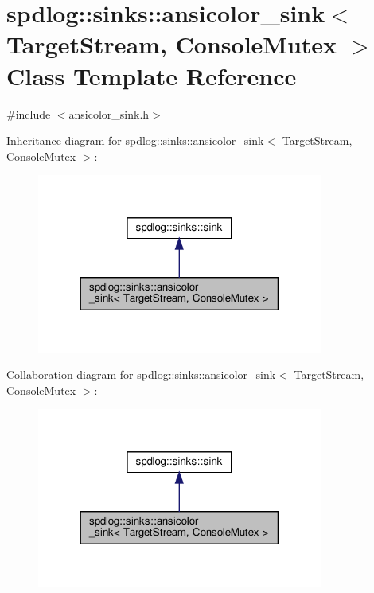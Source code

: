 \hypertarget{classspdlog_1_1sinks_1_1ansicolor__sink}{}\section{spdlog\+:\+:sinks\+:\+:ansicolor\+\_\+sink$<$ Target\+Stream, Console\+Mutex $>$ Class Template Reference}
\label{classspdlog_1_1sinks_1_1ansicolor__sink}


{\ttfamily \#include $<$ansicolor\+\_\+sink.\+h$>$}



Inheritance diagram for spdlog\+:\+:sinks\+:\+:ansicolor\+\_\+sink$<$ Target\+Stream, Console\+Mutex $>$\+:
\nopagebreak
\begin{figure}[H]
\begin{center}
\leavevmode
\includegraphics[width=266pt]{classspdlog_1_1sinks_1_1ansicolor__sink__inherit__graph}
\end{center}
\end{figure}


Collaboration diagram for spdlog\+:\+:sinks\+:\+:ansicolor\+\_\+sink$<$ Target\+Stream, Console\+Mutex $>$\+:
\nopagebreak
\begin{figure}[H]
\begin{center}
\leavevmode
\includegraphics[width=266pt]{classspdlog_1_1sinks_1_1ansicolor__sink__coll__graph}
\end{center}
\end{figure}
